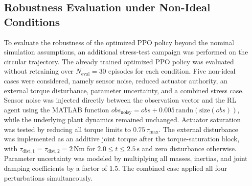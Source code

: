 \documentclass{ieeeaccess}
\begin{document}
\subsection{Robustness Evaluation under Non-Ideal Conditions}\label{sec:robustness_eval}
To evaluate the robustness of the optimized PPO policy beyond the nominal simulation assumptions,
an additional stress-test campaign was performed on the circular trajectory. The already trained optimized
PPO policy
was evaluated without retraining over $N_{\mathrm{eval}}=30$ episodes for each condition. Five non-ideal cases were
considered, namely sensor noise, reduced actuator authority, an external torque disturbance, parameter uncertainty, and
a
combined stress case. Sensor noise was injected directly between the observation vector and the
RL agent using the
MATLAB function $obs_{\mathrm{noisy}} = obs + 0.005\,\mathrm{randn}(\mathrm{size}(obs))$, while the underlying plant
dynamics remained unchanged. Actuator saturation was tested by reducing all torque limits to $0.75\,\tau_{\max}$.
The external disturbance was implemented as an additive joint torque after the torque-saturation block,
with
$\tau_{\mathrm{dist},1}=\tau_{\mathrm{dist},2}=2\,\mathrm{Nm}$ for $2.0 \leq t \leq 2.5\,\mathrm{s}$ and zero
disturbance otherwise. Parameter uncertainty was modeled by multiplying all masses, inertias, and joint damping
coefficients by a factor of $1.5$. The combined case applied all four perturbations simultaneously.
\end{document}
